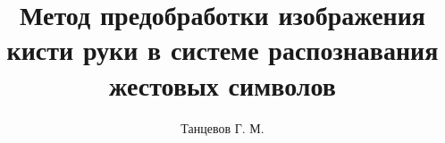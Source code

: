 \title{Метод предобработки изображения кисти руки в системе распознавания жестовых символов}

\author[addr1]{Танцевов Г. М.}


\address[addr1]{МГТУ им. Н. Э. Баумана, Москва, Россия}
